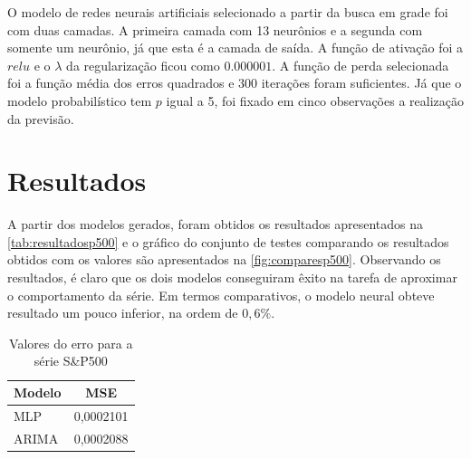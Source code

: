 \documentclass[
    12pt,
    oneside,
    a4paper,
    english,
    brazil
]{abntex2}
\begin{document}
O modelo  de redes neurais artificiais  selecionado a partir da  busca em grade
foi com duas camadas. A primeira  camada com 13 neurônios e a segunda com
somente um neurônio, já  que esta é a camada de saída. A  função de ativação
foi a $relu$ e o $\lambda$ da  regularização ficou como $0.000001$. A função de
perda selecionada foi a função média  dos erros quadrados e 300 iterações foram
suficientes. Já  que o modelo  probabilístico tem $p$ igual  a 5, foi  fixado em
cinco observações a realização da previsão.

\chapter{Resultados}\label{chap:result}

A  partir  dos  modelos  gerados,   foram  obtidos  os  resultados  apresentados
na   \autoref{tab:resultadosp500}   e  o   gráfico   do   conjunto  de   testes
comparando  os   resultados  obtidos  com   os  valores  são   apresentados  na
\autoref{fig:comparesp500}.  Observando  os  resultados,  é claro  que  os  dois
modelos conseguiram êxito  na tarefa de aproximar o comportamento  da série. Em
termos  comparativos, o modelo neural  obteve resultado  um pouco  inferior, na
ordem de $0,6\%$.

\begin{table}[ht]
    \centering
    \caption{Valores do erro para a série S\&P500}\label{tab:resultadosp500}
    \begin{tabular}{ll}
        \multicolumn{1}{c}{Modelo} & \multicolumn{1}{c}{MSE} \\
        \toprule
        MLP                        & 0,0002101               \\
        ARIMA                      & 0,0002088
    \end{tabular}
\end{table}
\end{document}
